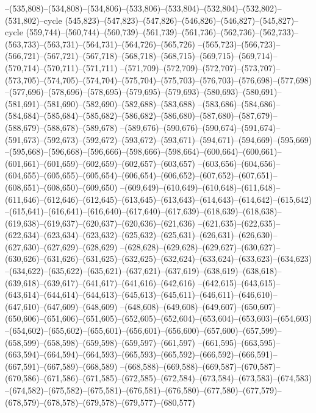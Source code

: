 --(535,808)--(534,808)--(534,806)--(533,806)--(533,804)--(532,804)--(532,802)--(531,802)--cycle
(545,823)--(547,823)--(547,826)--(546,826)--(546,827)--(545,827)--cycle
(559,744)--(560,744)--(560,739)--(561,739)--(561,736)--(562,736)--(562,733)--(563,733)--(563,731)--(564,731)--(564,726)--(565,726)
--(565,723)--(566,723)--(566,721)--(567,721)--(567,718)--(568,718)--(568,715)--(569,715)--(569,714)--(570,714)--(570,711)--(571,711)
--(571,709)--(572,709)--(572,707)--(573,707)--(573,705)--(574,705)--(574,704)--(575,704)--(575,703)--(576,703)--(576,698)--(577,698)
--(577,696)--(578,696)--(578,695)--(579,695)--(579,693)--(580,693)--(580,691)--(581,691)--(581,690)--(582,690)--(582,688)--(583,688)
--(583,686)--(584,686)--(584,684)--(585,684)--(585,682)--(586,682)--(586,680)--(587,680)--(587,679)--(588,679)--(588,678)--(589,678)
--(589,676)--(590,676)--(590,674)--(591,674)--(591,673)--(592,673)--(592,672)--(593,672)--(593,671)--(594,671)--(594,669)--(595,669)
--(595,668)--(596,668)--(596,666)--(598,666)--(598,664)--(600,664)--(600,661)--(601,661)--(601,659)--(602,659)--(602,657)--(603,657)
--(603,656)--(604,656)--(604,655)--(605,655)--(605,654)--(606,654)--(606,652)--(607,652)--(607,651)--(608,651)--(608,650)--(609,650)
--(609,649)--(610,649)--(610,648)--(611,648)--(611,646)--(612,646)--(612,645)--(613,645)--(613,643)--(614,643)--(614,642)--(615,642)
--(615,641)--(616,641)--(616,640)--(617,640)--(617,639)--(618,639)--(618,638)--(619,638)--(619,637)--(620,637)--(620,636)--(621,636)
--(621,635)--(622,635)--(622,634)--(623,634)--(623,632)--(625,632)--(625,631)--(626,631)--(626,630)--(627,630)--(627,629)--(628,629)
--(628,628)--(629,628)--(629,627)--(630,627)--(630,626)--(631,626)--(631,625)--(632,625)--(632,624)--(633,624)--(633,623)--(634,623)
--(634,622)--(635,622)--(635,621)--(637,621)--(637,619)--(638,619)--(638,618)--(639,618)--(639,617)--(641,617)--(641,616)--(642,616)
--(642,615)--(643,615)--(643,614)--(644,614)--(644,613)--(645,613)--(645,611)--(646,611)--(646,610)--(647,610)--(647,609)--(648,609)
--(648,608)--(649,608)--(649,607)--(650,607)--(650,606)--(651,606)--(651,605)--(652,605)--(652,604)--(653,604)--(653,603)--(654,603)
--(654,602)--(655,602)--(655,601)--(656,601)--(656,600)--(657,600)--(657,599)--(658,599)--(658,598)--(659,598)--(659,597)--(661,597)
--(661,595)--(663,595)--(663,594)--(664,594)--(664,593)--(665,593)--(665,592)--(666,592)--(666,591)--(667,591)--(667,589)--(668,589)
--(668,588)--(669,588)--(669,587)--(670,587)--(670,586)--(671,586)--(671,585)--(672,585)--(672,584)--(673,584)--(673,583)--(674,583)
--(674,582)--(675,582)--(675,581)--(676,581)--(676,580)--(677,580)--(677,579)--(678,579)--(678,578)--(679,578)--(679,577)--(680,577)
